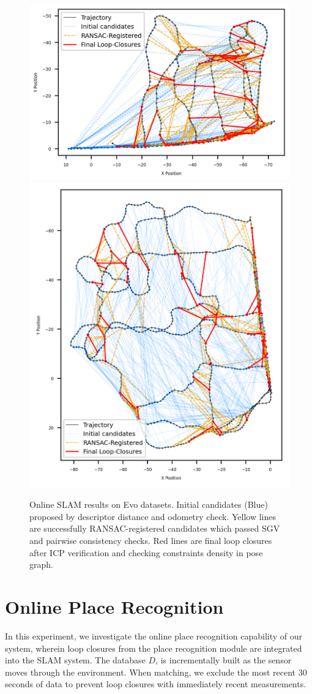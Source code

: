 \begin{figure}[t]
  \centering
  \includegraphics[width=0.8\columnwidth]{pics/exp_2_1_evo16_online.png}
  \includegraphics[width=0.8\columnwidth]{pics/exp_2_1_evo12_online.png}
  \caption{Online SLAM results on Evo datasets. Initial candidates (Blue) proposed by descriptor distance and odometry check. Yellow lines are successfully RANSAC-registered candidates which passed SGV and pairwise consistency checks. Red lines are final loop closures after ICP verification and checking constraints density in pose graph.}
  \label{fig:exp_2_1_online_place_recognition}
\end{figure}


\section{Online Place Recognition}
\label{sec:exp_online_slam}
In this experiment, we investigate the online place recognition capability of our system, wherein loop closures from the place recognition module are integrated into the SLAM system. The database $D$, is incrementally built as the sensor moves through the environment. When matching, we exclude the most recent 30 seconds of data to prevent loop closures with immediately recent measurements.
